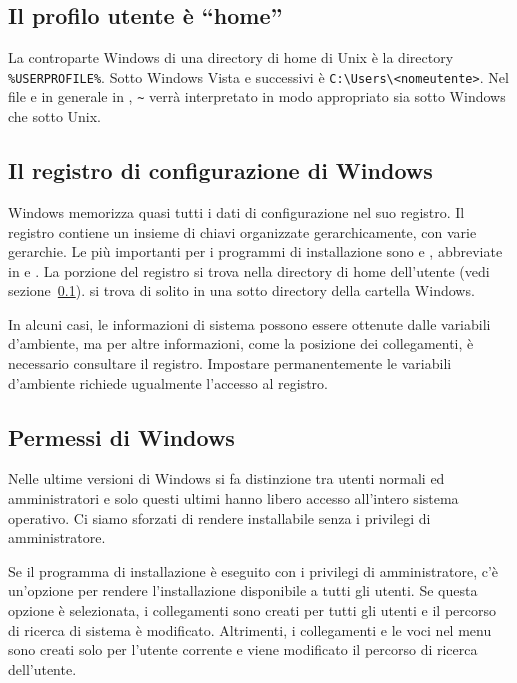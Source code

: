 \documentclass{article}
\begin{document}
\subsection{Il profilo utente è ``home''}
\label{sec:winhome}

La controparte Windows di una directory di home di Unix è la directory
\verb|%USERPROFILE%|. Sotto Windows Vista e successivi è
\verb|C:\Users\<nomeutente>|. Nel file
 e in
generale in \KPS{}, \verb|~| verrà interpretato in modo appropriato sia
sotto Windows che sotto Unix.


\subsection{Il registro di configurazione di Windows}
\label{sec:registry}

Windows memorizza quasi tutti i dati di configurazione nel suo registro.
Il registro contiene un insieme di chiavi organizzate gerarchicamente,
con varie gerarchie. Le più importanti per i programmi di installazione
sono  e , abbreviate in
 e . La porzione  del registro si trova
nella directory di home dell'utente (vedi sezione~\ref{sec:winhome}).
 si trova di solito in una sotto directory della cartella
Windows.

In alcuni casi, le informazioni di sistema possono essere ottenute dalle
variabili d'ambiente, ma per altre informazioni, come la posizione dei
collegamenti, è necessario consultare il registro. Impostare
permanentemente le variabili d'ambiente richiede ugualmente l'accesso al
registro.


\subsection{Permessi di Windows}
\label{sec:winpermissions}

Nelle ultime versioni di Windows si fa distinzione tra utenti normali ed
amministratori e solo questi ultimi hanno libero accesso all'intero
sistema operativo. Ci siamo sforzati di rendere \TL{} installabile senza i
privilegi di amministratore.

Se il programma di installazione è eseguito con i privilegi di
amministratore, c'è un'opzione per rendere l'installazione disponibile a
tutti gli utenti. Se questa opzione è selezionata, i collegamenti sono
creati per tutti gli utenti e il percorso di ricerca di sistema è modificato.
Altrimenti, i collegamenti e le voci nel menu sono creati solo per
l'utente corrente e viene modificato il percorso di ricerca dell'utente.
\end{document}
